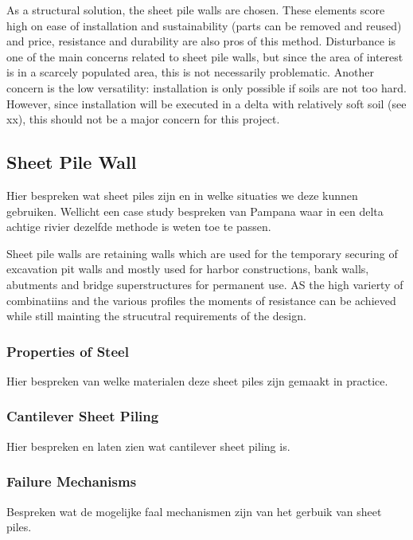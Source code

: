 As a structural solution, the sheet pile walls are chosen. These elements score high on ease of installation and sustainability (parts can be removed and reused) and price, resistance and durability are also pros of this method. Disturbance is one of the main concerns related to sheet pile walls, but since the area of interest is in a scarcely populated area, this is not necessarily problematic. Another concern is the low versatility: installation is only possible if soils are not too hard. However, since installation will be executed in a delta with relatively soft soil (see xx), this should not be a major concern for this project.

\subsection{Sheet Pile Wall}

Hier bespreken wat sheet piles zijn en in welke situaties we deze kunnen gebruiken. Wellicht een case study bespreken van Pampana waar in een delta achtige rivier dezelfde methode is weten toe te passen.


Sheet pile walls are retaining walls which are used for the temporary securing of excavation pit walls and mostly used for harbor constructions, bank walls, abutments and bridge superstructures for permanent use. AS the high varierty of combinatiins and the various profiles the moments of resistance can be achieved while still mainting the strucutral requirements of the design. 

\subsubsection{Properties of Steel}

Hier bespreken van welke materialen deze sheet piles zijn gemaakt in practice.

\subsubsection{Cantilever Sheet Piling}

Hier bespreken en laten zien wat cantilever sheet piling is. 

\subsubsection{Failure Mechanisms}

Bespreken wat de mogelijke faal mechanismen zijn van het gerbuik van sheet piles.

